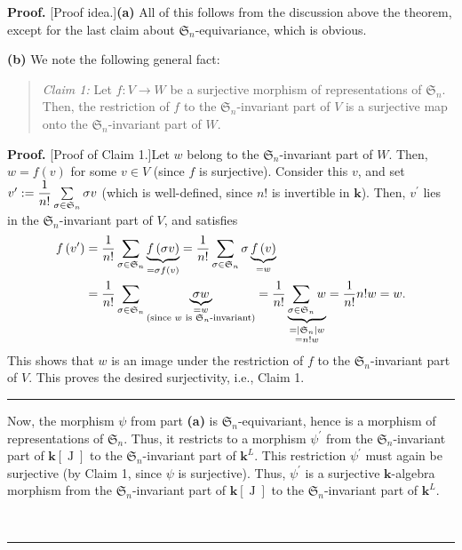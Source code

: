 \documentclass[numbers=enddot,12pt,final,onecolumn,notitlepage]{scrartcl}%
\theoremstyle{definition}
\newenvironment{statement}{\begin{quote}}{\end{quote}}
\newenvironment{proof}[1][Proof]{\noindent\textbf{#1.} }{\ \rule{0.5em}{0.5em}}
\let\sumnonlimits\sum
\renewcommand{\sum}{\sumnonlimits\limits}
\begin{document}
\begin{proof}
[Proof idea.]\textbf{(a)} All of this follows from the discussion above the
theorem, except for the last claim about $\mathfrak{S}_{n}$-equivariance,
which is obvious. \medskip

\textbf{(b)} We note the following general fact:

\begin{statement}
\textit{Claim 1:} Let $f:V\rightarrow W$ be a surjective morphism of
representations of $\mathfrak{S}_{n}$. Then, the restriction of $f$ to the
$\mathfrak{S}_{n}$-invariant part of $V$ is a surjective map onto the
$\mathfrak{S}_{n}$-invariant part of $W$.
\end{statement}

\begin{proof}
[Proof of Claim 1.]Let $w$ belong to the $\mathfrak{S}_{n}$-invariant part of
$W$. Then, $w=f\left(  v\right)  $ for some $v\in V$ (since $f$ is
surjective). Consider this $v$, and set $v^{\prime}:=\dfrac{1}{n!}%
\sum\limits_{\sigma\in\mathfrak{S}_{n}}\sigma v$ (which is well-defined, since
$n!$ is invertible in $\mathbf{k}$). Then, $v^{\prime}$ lies in the
$\mathfrak{S}_{n}$-invariant part of $V$, and satisfies
\begin{align*}
f\left(  v^{\prime}\right)   &  =\dfrac{1}{n!}\sum\limits_{\sigma
\in\mathfrak{S}_{n}}\underbrace{f\left(  \sigma v\right)  }_{=\sigma f\left(
v\right)  }=\dfrac{1}{n!}\sum\limits_{\sigma\in\mathfrak{S}_{n}}%
\sigma\underbrace{f\left(  v\right)  }_{=w}\\
&  =\dfrac{1}{n!}\sum\limits_{\sigma\in\mathfrak{S}_{n}}\underbrace{\sigma
w}_{\substack{=w\\\text{(since }w\text{ is }\mathfrak{S}_{n}\text{-invariant)}%
}}=\dfrac{1}{n!}\underbrace{\sum\limits_{\sigma\in\mathfrak{S}_{n}}%
w}_{\substack{=\left\vert \mathfrak{S}_{n}\right\vert w\\=n!w}}=\dfrac{1}%
{n!}n!w=w.
\end{align*}
This shows that $w$ is an image under the restriction of $f$ to the
$\mathfrak{S}_{n}$-invariant part of $V$. This proves the desired
surjectivity, i.e., Claim 1.
\end{proof}

Now, the morphism $\psi$ from part \textbf{(a)} is $\mathfrak{S}_{n}%
$-equivariant, hence is a morphism of representations of $\mathfrak{S}_{n}$.
Thus, it restricts to a morphism $\psi^{\prime}$ from the $\mathfrak{S}_{n}%
$-invariant part of $\mathbf{k}\left[  \operatorname*{J}\right]  $ to the
$\mathfrak{S}_{n}$-invariant part of $\mathbf{k}^{L}$. This restriction
$\psi^{\prime}$ must again be surjective (by Claim 1, since $\psi$ is
surjective). Thus, $\psi^{\prime}$ is a surjective $\mathbf{k}$-algebra
morphism from the $\mathfrak{S}_{n}$-invariant part of $\mathbf{k}\left[
\operatorname*{J}\right]  $ to the $\mathfrak{S}_{n}$-invariant part of
$\mathbf{k}^{L}$.


\end{proof}
\end{document}
